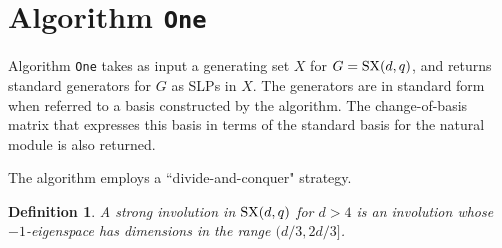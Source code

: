 \documentclass[12pt]{article}
\newtheorem{definition}{Definition}[section]
\def\SX{{\rm SX}}
\begin{document}
\section{Algorithm {\tt One}}
\label{Alg1}

Algorithm {\tt One} takes as input a generating set $X$ for
$G=\SX(d,q)$, and returns standard generators for $G$ as SLPs in $X$.
The generators are in standard form 
when referred to a basis constructed  by the algorithm. The change-of-basis 
matrix that expresses this basis in terms of the standard basis for the natural
module is also returned.

The algorithm employs a ``divide-and-conquer" strategy. 
\begin{definition}
A {\it strong involution} in $\SX(d,q)$ for $d > 4$ is an involution whose
$-1$-eigenspace has dimensions in the range $(d/3,2d/3]$. 
\end{definition}
\end{document}
